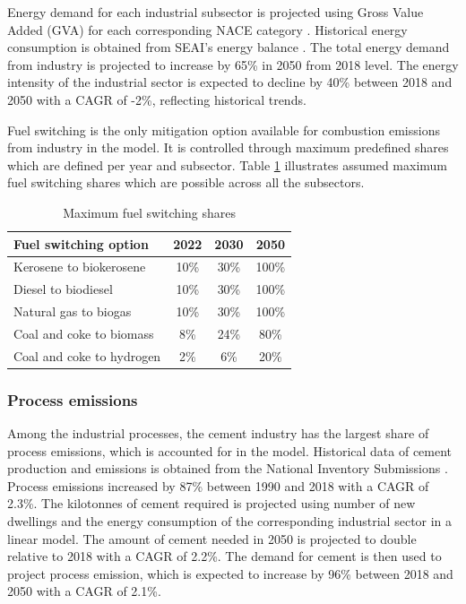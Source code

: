 \documentclass[journal abbreviation, manuscript]{copernicus}
\begin{document}
Energy demand for each industrial subsector is projected using Gross Value Added (GVA) for each corresponding NACE category \cite{Yakut2020}. Historical energy consumption is obtained from SEAI's energy balance \cite{SEAI2019}. The total energy demand from industry is projected to increase by 65\% in 2050 from 2018 level. The energy intensity of the industrial sector is expected to decline by 40\% between 2018 and 2050 with a CAGR of -2\%, reflecting historical trends. 

Fuel switching is the only mitigation option available for combustion emissions from industry in the model. It is controlled through maximum predefined shares which are defined per year and subsector. Table \ref{Maximum fuel switching share in Industry} illustrates assumed maximum fuel switching shares which are possible across all the subsectors. 

\begin{table}[htbp]
\footnotesize
 \centering
 \caption{Maximum fuel switching shares}
 \begin{tabular}{lccc}
 \hline
 Fuel switching option & 2022 & 2030 & 2050 \\
 \hline
 Kerosene to biokerosene & 10\% & 30\% & 100\% \\
 Diesel to biodiesel & 10\% & 30\% & 100\% \\
 Natural gas to biogas & 10\% & 30\% & 100\% \\ 
 Coal and coke to biomass & 8\% & 24\% & 80\% \\ 
 Coal and coke to hydrogen & 2\% & 6\% & 20\% \\ \hline
 \end{tabular}%
 \label{Maximum fuel switching share in Industry}%
\end{table}%

\subsubsection{Process emissions}
Among the industrial processes, the cement industry has the largest share of process emissions, which is accounted for in the model. Historical data of cement production and emissions is obtained from the National Inventory Submissions \cite{NIR2020E91:online}. Process emissions increased by 87\% between 1990 and 2018 with a CAGR of 2.3\%. The kilotonnes of cement required is projected using number of new dwellings and the energy consumption of the corresponding industrial sector in a linear model. The amount of cement needed in 2050 is projected to double relative to 2018 with a CAGR of 2.2\%. The demand for cement is then used to project process emission, which is expected to increase by 96\% between 2018 and 2050 with a CAGR of 2.1\%. 
\end{document}
